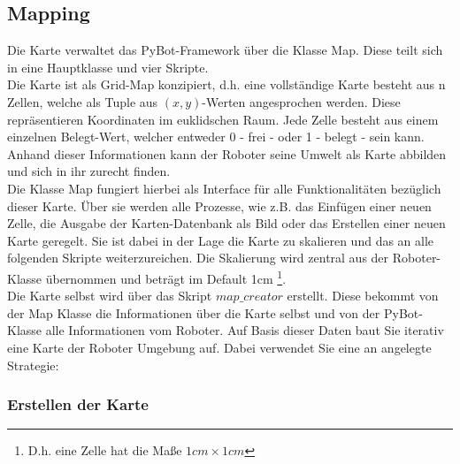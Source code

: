 \documentclass[twoside,12pt,a4paper]{report}
\begin{document}
	\subsection{Mapping}
	Die Karte verwaltet das PyBot-Framework über die Klasse Map. Diese teilt sich in eine Hauptklasse und vier Skripte.\\
	Die Karte ist als Grid-Map konzipiert, d.h. eine vollständige Karte besteht aus n Zellen, welche als Tuple aus $(x,y)$-Werten angesprochen werden. Diese repräsentieren Koordinaten im euklidschen Raum. Jede Zelle besteht aus einem einzelnen Belegt-Wert, welcher entweder 0 - frei - oder 1 - belegt - sein kann. Anhand dieser Informationen kann der Roboter seine Umwelt als Karte abbilden und sich in ihr zurecht finden. \\
	Die Klasse Map fungiert hierbei als Interface für alle Funktionalitäten bezüglich dieser Karte. Über sie werden alle Prozesse, wie z.B. das Einfügen einer neuen Zelle, die Ausgabe der Karten-Datenbank als Bild oder das Erstellen einer neuen Karte geregelt. Sie ist dabei in der Lage die Karte zu skalieren und das an alle folgenden Skripte weiterzureichen. Die Skalierung wird zentral aus der Roboter-Klasse übernommen und beträgt im Default 1cm \footnote{D.h. eine Zelle hat die Maße $1cm \times 1cm$}.\\
	Die Karte selbst wird über das Skript $map\_creator $ erstellt. Diese bekommt von der Map Klasse die Informationen über die Karte selbst und von der PyBot-Klasse alle Informationen vom Roboter. Auf Basis dieser Daten baut Sie iterativ eine Karte der Roboter Umgebung auf. Dabei verwendet Sie eine an \cite{Hofmeister} angelegte Strategie: 
	
	\subsubsection{Erstellen der Karte}
	
\end{document}
